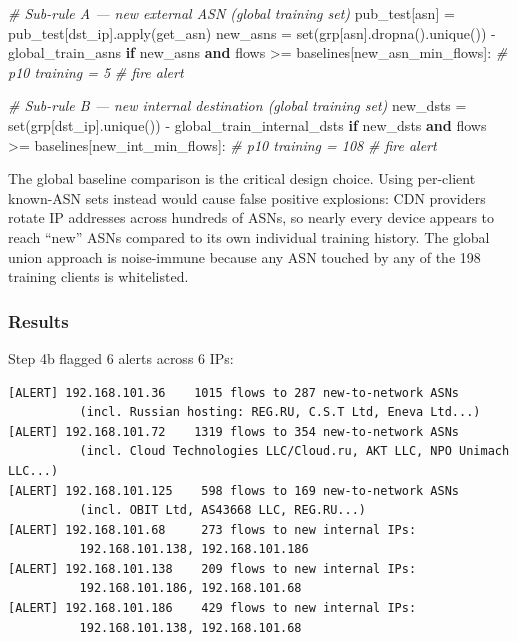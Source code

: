 \documentclass[
  11pt,
]{article}
\newenvironment{Shaded}{\vspace{4pt}}{\vspace{4pt}}
\newcommand{\BuiltInTok}[1]{\textcolor[rgb]{0.00,0.50,0.00}{#1}}
\newcommand{\CommentTok}[1]{\textcolor[rgb]{0.38,0.63,0.69}{\textit{#1}}}
\newcommand{\ControlFlowTok}[1]{\textcolor[rgb]{0.00,0.44,0.13}{\textbf{#1}}}
\newcommand{\KeywordTok}[1]{\textcolor[rgb]{0.00,0.44,0.13}{\textbf{#1}}}
\newcommand{\NormalTok}[1]{#1}
\newcommand{\OperatorTok}[1]{\textcolor[rgb]{0.40,0.40,0.40}{#1}}
\newcommand{\StringTok}[1]{\textcolor[rgb]{0.25,0.44,0.63}{#1}}
\begin{document}
\begin{Shaded}
\begin{Highlighting}[]
\CommentTok{\# Sub{-}rule A — new external ASN (global training set)}
\NormalTok{pub\_test[}\StringTok{\textquotesingle{}asn\textquotesingle{}}\NormalTok{] }\OperatorTok{=}\NormalTok{ pub\_test[}\StringTok{\textquotesingle{}dst\_ip\textquotesingle{}}\NormalTok{].}\BuiltInTok{apply}\NormalTok{(get\_asn)}
\NormalTok{new\_asns }\OperatorTok{=} \BuiltInTok{set}\NormalTok{(grp[}\StringTok{\textquotesingle{}asn\textquotesingle{}}\NormalTok{].dropna().unique()) }\OperatorTok{{-}}\NormalTok{ global\_train\_asns}
\ControlFlowTok{if}\NormalTok{ new\_asns }\KeywordTok{and}\NormalTok{ flows }\OperatorTok{\textgreater{}=}\NormalTok{ baselines[}\StringTok{\textquotesingle{}new\_asn\_min\_flows\textquotesingle{}}\NormalTok{]:  }\CommentTok{\# p10 training = 5}
    \CommentTok{\# fire alert}

\CommentTok{\# Sub{-}rule B — new internal destination (global training set)}
\NormalTok{new\_dsts }\OperatorTok{=} \BuiltInTok{set}\NormalTok{(grp[}\StringTok{\textquotesingle{}dst\_ip\textquotesingle{}}\NormalTok{].unique()) }\OperatorTok{{-}}\NormalTok{ global\_train\_internal\_dsts}
\ControlFlowTok{if}\NormalTok{ new\_dsts }\KeywordTok{and}\NormalTok{ flows }\OperatorTok{\textgreater{}=}\NormalTok{ baselines[}\StringTok{\textquotesingle{}new\_int\_min\_flows\textquotesingle{}}\NormalTok{]:  }\CommentTok{\# p10 training = 108}
    \CommentTok{\# fire alert}
\end{Highlighting}
\end{Shaded}

The global baseline comparison is the critical design choice. Using
per-client known-ASN sets instead would cause false positive explosions:
CDN providers rotate IP addresses across hundreds of ASNs, so nearly
every device appears to reach ``new'' ASNs compared to its own
individual training history. The global union approach is noise-immune
because any ASN touched by any of the 198 training clients is
whitelisted.

\hypertarget{results-1}{%
\subsubsection{Results}\label{results-1}}

Step 4b flagged 6 alerts across 6 IPs:

\begin{verbatim}
[ALERT] 192.168.101.36    1015 flows to 287 new-to-network ASNs
          (incl. Russian hosting: REG.RU, C.S.T Ltd, Eneva Ltd...)
[ALERT] 192.168.101.72    1319 flows to 354 new-to-network ASNs
          (incl. Cloud Technologies LLC/Cloud.ru, AKT LLC, NPO Unimach LLC...)
[ALERT] 192.168.101.125    598 flows to 169 new-to-network ASNs
          (incl. OBIT Ltd, AS43668 LLC, REG.RU...)
[ALERT] 192.168.101.68     273 flows to new internal IPs:
          192.168.101.138, 192.168.101.186
[ALERT] 192.168.101.138    209 flows to new internal IPs:
          192.168.101.186, 192.168.101.68
[ALERT] 192.168.101.186    429 flows to new internal IPs:
          192.168.101.138, 192.168.101.68
\end{verbatim}
\end{document}
